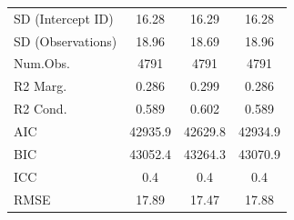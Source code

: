 \documentclass[]{report}
\begin{document}
\begin{table}
{\begin{tabular}[t]{lccc}
			SD (Intercept ID) & \num{16.28} & \num{16.29} & \num{16.28}\\
			SD (Observations) & \num{18.96} & \num{18.69} & \num{18.96}\\
			\midrule
			Num.Obs. & \num{4791} & \num{4791} & \num{4791}\\
			R2 Marg. & \num{0.286} & \num{0.299} & \num{0.286}\\
			R2 Cond. & \num{0.589} & \num{0.602} & \num{0.589}\\
			AIC & \num{42935.9} & \num{42629.8} & \num{42934.9}\\
			BIC & \num{43052.4} & \num{43264.3} & \num{43070.9}\\
			ICC & \num{0.4} & \num{0.4} & \num{0.4}\\
			RMSE & \num{17.89} & \num{17.47} & \num{17.88}\\
			\bottomrule
	\end{tabular}}
\end{table}
\end{document}
